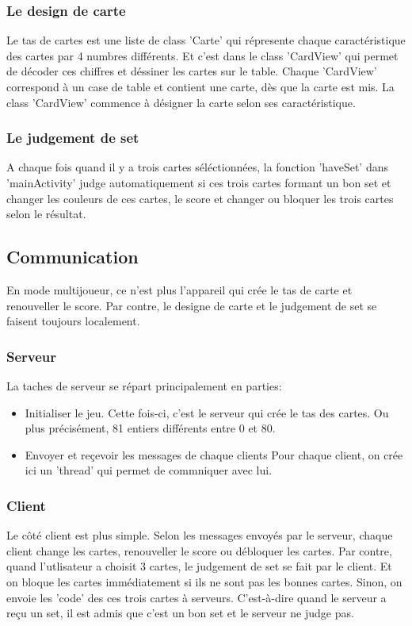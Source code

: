 \documentclass[paper=a4, french]{scrartcl} %
\numberwithin{equation}{section} %
\numberwithin{figure}{section} %
\numberwithin{table}{section} %
\begin{document}
		\subsubsection{Le design de carte}
Le tas de cartes est une liste de class 'Carte' qui répresente chaque caractéristique des cartes par 4 numbres différents. Et c'est dans le class 'CardView' qui permet de décoder ces chiffres et déssiner les cartes sur le table.
Chaque 'CardView' correspond à un case de table et contient une carte, dès que la carte est mis. La class 'CardView' commence à désigner la carte selon ses caractéristique.

		\subsubsection{Le judgement de set}
A chaque fois quand il y a trois cartes séléctionnées, la fonction 'haveSet' dans 'mainActivity' judge automatiquement si ces trois cartes formant un bon set et changer les couleurs de ces cartes, le score et changer ou bloquer les trois cartes selon le résultat.
 
 
	\subsection{Communication}

En mode multijoueur, ce n'est plus l'appareil qui crée le tas de carte et renouveller le score. Par contre, le designe de carte et le judgement de set se faisent toujours localement.
		\subsubsection{Serveur}
La taches de serveur se répart principalement en parties:
	\begin{itemize}
	\item Initialiser le jeu.
	Cette fois-ci, c'est le serveur qui crée le tas des cartes. Ou plus précisément, 81 entiers différents entre 0 et 80.
	\item Envoyer et reçevoir les messages de chaque clients
	Pour chaque client, on crée ici un 'thread' qui permet de commniquer avec lui. 
	\end{itemize}
	
		\subsubsection{Client}
	Le côté client est plus simple. Selon les messages envoyés par le serveur, chaque client change les cartes, renouveller le score ou débloquer les cartes.
	Par contre, quand l'utlisateur a choisit 3 cartes, le judgement de set se fait par le client. Et on bloque les cartes immédiatement si ils ne sont pas les bonnes cartes. Sinon, on envoie les 'code' des ces trois cartes à serveurs. C'est-à-dire quand le serveur a reçu un set, il est admis que c'est un bon set et le serveur ne judge pas.
	
\end{document}
